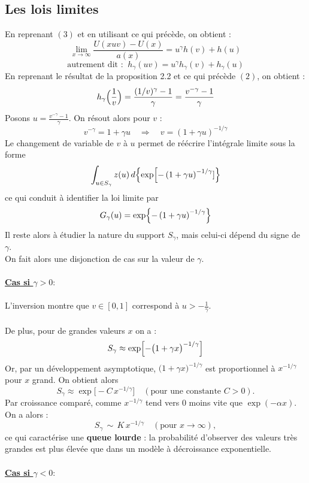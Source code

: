 \documentclass{article}
\theoremstyle{plain}
\theoremstyle{definition}
\theoremstyle{plain}
\begin{document}
\subsection{Les lois limites}
En reprenant $(3)$ et en utilisant ce qui précède, on obtient :
\[
\lim_{x\to \infty} \frac{U(xuv) - U(x)}{a(x)} = u^{\gamma} h(v) + h(u)
\]
\[
\text{autrement dit :} \; \; h_{\gamma}(uv)= u^{\gamma} h_{\gamma}(v) + h_{\gamma}(u)
\]
En reprenant le résultat de la proposition 2.2 et ce qui précède  $(2)$, on obtient :
\[
h_\gamma\Bigl(\frac{1}{v}\Bigr)=\frac{(1/v)^\gamma-1}{\gamma}=\frac{v^{-\gamma}-1}{\gamma}
\]
Posons \(u=\frac{v^{-\gamma}-1}{\gamma}\). On résout alors pour \(v\) :
\[
v^{-\gamma}=1+\gamma u\quad\Longrightarrow\quad v=(1+\gamma u)^{-1/\gamma}
\]
Le changement de variable de \(v\) à \(u\) permet de réécrire l'intégrale limite sous la forme
\[
\int_{u\in S_\gamma} z(u)\,d\Bigl\{\exp\Bigl[-\left(1+\gamma u\right)^{-1/\gamma}]\Bigr\}
\]
ce qui conduit à identifier la loi limite par
\[
G_\gamma(u)=\exp\Bigl\{-\left(1+\gamma u\right)^{-1/\gamma}\Bigr\}
\]
Il reste alors à étudier la nature du support \(S_\gamma\), mais celui-ci dépend du signe de \(\gamma\).
\\
On fait alors une disjonction de cas sur la valeur de $\gamma$.
\\
\\
\textbf{\underline{Cas si \(\gamma>0 : \)}}
\\
\\
L'inversion montre que \(v\in [0,1]\) correspond à \(u>-\frac{1}{\gamma}\).
\\
\\
De plus, pour de grandes valeurs \(x\) on a :
\[
S_{\gamma} \approx \exp\Bigl[-\bigl(1 + \gamma x\bigr)^{-1/\gamma}\Bigr]
\]
Or, par un développement asymptotique,  \(\bigl(1 + \gamma x\bigr)^{-1/\gamma}\) est proportionnel à \(x^{-1/\gamma}\) pour \(x\) grand. On obtient alors
\[
S_{\gamma} \approx \exp\bigl[-C\,x^{-1/\gamma}\bigr] 
\quad (\text{pour une constante } C>0).
\]
Par croissance comparé, comme \(x^{-1/\gamma}\) tend vers 0 moins vite que \(\exp(-\alpha x)\). On a alors : 
\[
S_{\gamma}\,\sim\, K\,x^{-1/\gamma} 
\quad (\text{pour } x\to\infty),
\]
ce qui caractérise une \textbf{queue lourde} : la probabilité d'observer des valeurs très grandes est plus élevée que dans un modèle à décroissance exponentielle.
\\
\\
\textbf{\underline{Cas si \(\gamma<0 : \)}}
\\
\\
\end{document}
